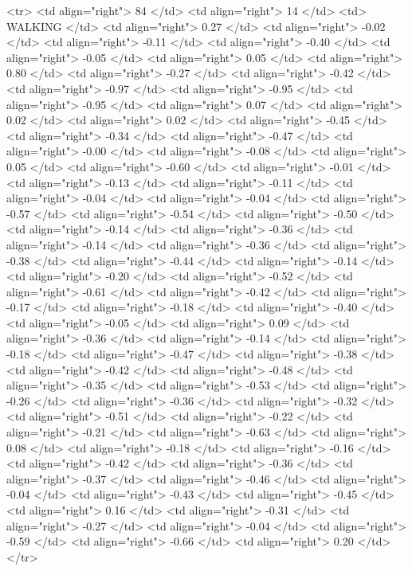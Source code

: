   <tr> <td align="right"> 84 </td> <td align="right">  14 </td> <td> WALKING </td> <td align="right"> 0.27 </td> <td align="right"> -0.02 </td> <td align="right"> -0.11 </td> <td align="right"> -0.40 </td> <td align="right"> -0.05 </td> <td align="right"> 0.05 </td> <td align="right"> 0.80 </td> <td align="right"> -0.27 </td> <td align="right"> -0.42 </td> <td align="right"> -0.97 </td> <td align="right"> -0.95 </td> <td align="right"> -0.95 </td> <td align="right"> 0.07 </td> <td align="right"> 0.02 </td> <td align="right"> 0.02 </td> <td align="right"> -0.45 </td> <td align="right"> -0.34 </td> <td align="right"> -0.47 </td> <td align="right"> -0.00 </td> <td align="right"> -0.08 </td> <td align="right"> 0.05 </td> <td align="right"> -0.60 </td> <td align="right"> -0.01 </td> <td align="right"> -0.13 </td> <td align="right"> -0.11 </td> <td align="right"> -0.04 </td> <td align="right"> -0.04 </td> <td align="right"> -0.57 </td> <td align="right"> -0.54 </td> <td align="right"> -0.50 </td> <td align="right"> -0.14 </td> <td align="right"> -0.36 </td> <td align="right"> -0.14 </td> <td align="right"> -0.36 </td> <td align="right"> -0.38 </td> <td align="right"> -0.44 </td> <td align="right"> -0.14 </td> <td align="right"> -0.20 </td> <td align="right"> -0.52 </td> <td align="right"> -0.61 </td> <td align="right"> -0.42 </td> <td align="right"> -0.17 </td> <td align="right"> -0.18 </td> <td align="right"> -0.40 </td> <td align="right"> -0.05 </td> <td align="right"> 0.09 </td> <td align="right"> -0.36 </td> <td align="right"> -0.14 </td> <td align="right"> -0.18 </td> <td align="right"> -0.47 </td> <td align="right"> -0.38 </td> <td align="right"> -0.42 </td> <td align="right"> -0.48 </td> <td align="right"> -0.35 </td> <td align="right"> -0.53 </td> <td align="right"> -0.26 </td> <td align="right"> -0.36 </td> <td align="right"> -0.32 </td> <td align="right"> -0.51 </td> <td align="right"> -0.22 </td> <td align="right"> -0.21 </td> <td align="right"> -0.63 </td> <td align="right"> 0.08 </td> <td align="right"> -0.18 </td> <td align="right"> -0.16 </td> <td align="right"> -0.42 </td> <td align="right"> -0.36 </td> <td align="right"> -0.37 </td> <td align="right"> -0.46 </td> <td align="right"> -0.04 </td> <td align="right"> -0.43 </td> <td align="right"> -0.45 </td> <td align="right"> 0.16 </td> <td align="right"> -0.31 </td> <td align="right"> -0.27 </td> <td align="right"> -0.04 </td> <td align="right"> -0.59 </td> <td align="right"> -0.66 </td> <td align="right"> 0.20 </td> </tr>
